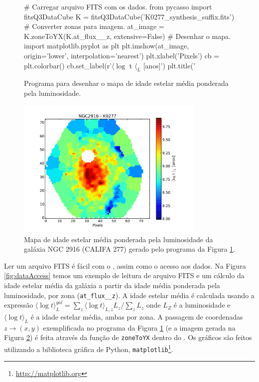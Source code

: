 \begin{figure}
	\begin{python}
# Carregar arquivo FITS com os dados.
from pycasso import fitsQ3DataCube
K = fitsQ3DataCube('K0277_synthesis_suffix.fits')
# Converter zonas para imagem.
at_image = K.zoneToYX(K.at_flux__z, extensive=False)
# Desenhar o mapa.
import matplotlib.pyplot as plt
plt.imshow(at_image, origin='lower', interpolation='nearest')
plt.xlabel('Pixels')
cb = plt.colorbar()
cb.set_label(r'$\langle \log$ t $\langle_L$ [anos]')
plt.title('%
	\end{python}
	\caption[Programa idade estelar média.]
	{Programa para desenhar o mapa de idade	estelar média ponderada pela luminosidade.}
	\label{fig:programaMapaIdade}
\end{figure}

\begin{figure}
	\includegraphics[width=0.8\textwidth]{figuras/K0277-at_flux_zone.pdf}
	\caption[Mapa da idade estelar média da galáxia NGC 2916 (CALIFA 277).] 
	{Mapa de idade estelar média ponderada pela luminosidade da galáxia NGC 2916 (CALIFA 277) gerado pelo programa da
	Figura \ref{fig:programaMapaIdade}.}
	\label{fig:mapaIdade}
\end{figure}

Ler um arquivo FITS é fácil com o \pycasso, assim como o acesso aos dados. Na Figura \ref{fig:dataAccess} temos um
exemplo de leitura de arquivo FITS e um cálculo da idade estelar média da galáxia a partir da idade média ponderada pela
luminosidade, por zona (\texttt{at\_flux\_\_z}). A idade estelar média é calculada usando a expressão $ \langle \log t
\rangle^{gal}_L = \sum_z \langle \log t \rangle_{L,z} L_z /\sum_z L_z$ onde $L_Z $ é a luminosidade e $ \langle \log t
\rangle_L $ é a idade estelar média, ambas por zona. A passagem de coordenadas $z \to (x, y)$ exemplificada no programa
da Figura \ref{fig:programaMapaIdade} (e a imagem gerada na Figura \ref{fig:mapaIdade}) é feita através da função de
\texttt{zoneToYX} dentro do \pycasso. Os gráficos são feitos utilizando a biblioteca gráfica de Python,
\texttt{matplotlib}\footnote{\url{http://matplotlib.org}}.

